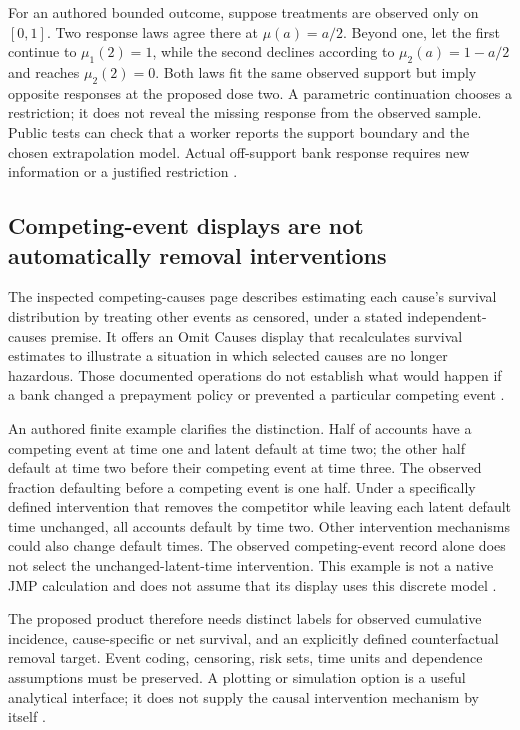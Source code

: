For an authored bounded outcome, suppose treatments are observed only on
$[0,1]$. Two response laws agree there at $\mu(a)=a/2$. Beyond one, let
the first continue to $\mu_1(2)=1$, while the second declines according to
$\mu_2(a)=1-a/2$ and reaches $\mu_2(2)=0$. Both laws fit the same
observed support but imply opposite responses at the proposed dose two.
A parametric continuation chooses a restriction; it does not reveal the
missing response from the observed sample. Public tests can check that a
worker reports the support boundary and the chosen extrapolation model.
Actual off-support bank response requires new information or a justified
restriction \citep{exec24_jmp_choice}.

\subsection{Competing-event displays are not automatically removal interventions}
The inspected competing-causes page describes estimating each cause's
survival distribution by treating other events as censored, under a stated
independent-causes premise. It offers an Omit Causes display that
recalculates survival estimates to illustrate a situation in which selected
causes are no longer hazardous. Those documented operations do not establish
what would happen if a bank changed a prepayment policy or prevented a
particular competing event
\citep{exec14_survival_jmp}.

An authored finite example clarifies the distinction. Half of accounts
have a competing event at time one and latent default at time two; the
other half default at time two before their competing event at time three.
The observed fraction defaulting before a competing event is one half.
Under a specifically defined intervention that removes the competitor
while leaving each latent default time unchanged, all accounts default
by time two. Other intervention mechanisms could also change default
times. The observed competing-event record alone does not select the
unchanged-latent-time intervention. This example is not a native JMP
calculation and does not assume that its display uses this discrete model
\citep{exec24_jmp_choice}.

The proposed product therefore needs distinct labels for observed
cumulative incidence, cause-specific or net survival, and an explicitly
defined counterfactual removal target. Event coding, censoring, risk sets,
time units and dependence assumptions must be preserved. A plotting or
simulation option is a useful analytical interface; it does not supply the
causal intervention mechanism by itself
\citep{exec14_survival_jmp,exec24_jmp_choice}.

